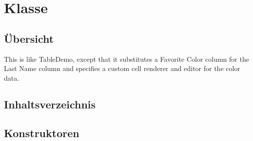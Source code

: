 
\section[ClassTableLog]{Klasse }\label{ontologyFramework.OFErrorManagement.OFGUI.allInstancesGUI.ClassTableLog-class}
\subsection{Übersicht}
This is like TableDemo, except that it substitutes a
 Favorite Color column for the Last Name column and specifies
 a custom cell renderer and editor for the color data.
\subsection{Inhaltsverzeichnis}
\subsection{Konstruktoren}
\begin{description}
\item[{\label{ontologyFramework.OFErrorManagement.OFGUI.allInstancesGUI.ClassTableLog(javax.swing.JFrame)}}]
~ 
\end{description}
